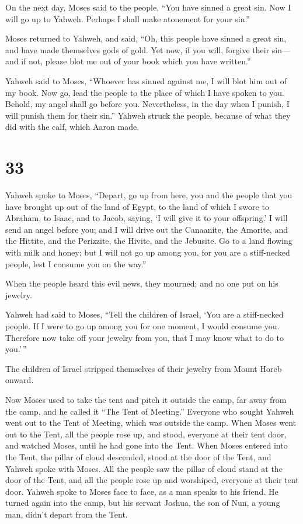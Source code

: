  On the next day, Moses said to the people, ``You have
sinned a great sin. Now I will go up to Yahweh. Perhaps I shall make
atonement for your sin.''

 Moses returned to Yahweh, and said, ``Oh, this people
have sinned a great sin, and have made themselves gods of gold.
 Yet now, if you will, forgive their sin---and if not,
please blot me out of your book which you have written.''

 Yahweh said to Moses, ``Whoever has sinned against me, I
will blot him out of my book.  Now go, lead the people to
the place of which I have spoken to you. Behold, my angel shall go
before you. Nevertheless, in the day when I punish, I will punish them
for their sin.''  Yahweh struck the people, because of
what they did with the calf, which Aaron made.

\hypertarget{section-32}{%
\section{33}\label{section-32}}

 Yahweh spoke to Moses, ``Depart, go up from here, you and
the people that you have brought up out of the land of Egypt, to the
land of which I swore to Abraham, to Isaac, and to Jacob, saying, `I
will give it to your offspring.'  I will send an angel
before you; and I will drive out the Canaanite, the Amorite, and the
Hittite, and the Perizzite, the Hivite, and the Jebusite. 
Go to a land flowing with milk and honey; but I will not go up among
you, for you are a stiff-necked people, lest I consume you on the way.''

 When the people heard this evil news, they mourned; and
no one put on his jewelry.

 Yahweh had said to Moses, ``Tell the children of Israel,
`You are a stiff-necked people. If I were to go up among you for one
moment, I would consume you. Therefore now take off your jewelry from
you, that I may know what to do to you.'\,''

 The children of Israel stripped themselves of their
jewelry from Mount Horeb onward.

 Now Moses used to take the tent and pitch it outside the
camp, far away from the camp, and he called it ``The Tent of Meeting.''
Everyone who sought Yahweh went out to the Tent of Meeting, which was
outside the camp.  When Moses went out to the Tent, all
the people rose up, and stood, everyone at their tent door, and watched
Moses, until he had gone into the Tent.  When Moses
entered into the Tent, the pillar of cloud descended, stood at the door
of the Tent, and Yahweh spoke with Moses.  All the people
saw the pillar of cloud stand at the door of the Tent, and all the
people rose up and worshiped, everyone at their tent door.
 Yahweh spoke to Moses face to face, as a man speaks to
his friend. He turned again into the camp, but his servant Joshua, the
son of Nun, a young man, didn't depart from the Tent.

